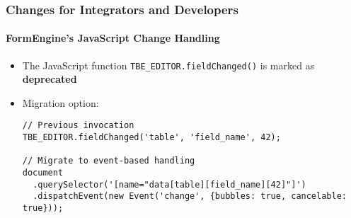 %

\begin{frame}[fragile]
	\frametitle{Changes for Integrators and Developers}
	\framesubtitle{FormEngine's JavaScript Change Handling}


	\begin{itemize}
		\item The JavaScript function \texttt{TBE\_EDITOR.fieldChanged()} is
			marked as \textbf{deprecated}
		\item Migration option:
			\vspace{0.2cm}
\begin{lstlisting}
// Previous invocation
TBE_EDITOR.fieldChanged('table', 'field_name', 42);

// Migrate to event-based handling
document
  .querySelector('[name="data[table][field_name][42]"]')
  .dispatchEvent(new Event('change', {bubbles: true, cancelable: true}));
\end{lstlisting}

	\end{itemize}
\end{frame}

